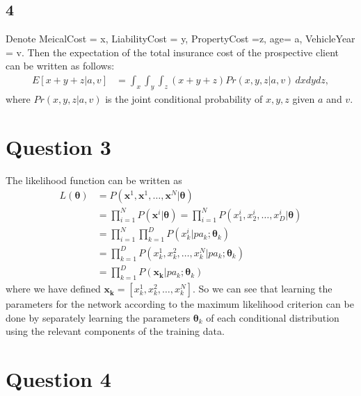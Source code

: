 \documentclass[paper=a4, fontsize=15pt]{article} %
\begin{document}
\subsection*{4}
Denote MeicalCost = x,  LiabilityCost = y,  PropertyCost =z, age= a, VehicleYear = v. 
Then the expectation of the total insurance cost of the prospective client can be written as follows:
\begin{align}
E[x+y+z|a,v]
& = \int_x \int_y \int_z (x+y+z) Pr(x,y,z|a,v)\, dxdydz,   \nonumber
\end{align}
where $Pr(x,y,z|a,v)$ is the joint conditional probability of $x,y,z$ given $a$ and $v$.




\section*{Question 3}
The likelihood function can be written as 
\begin{align}
L(\boldsymbol{\theta})
& = P(\textbf{x}^1,\textbf{x}^1,\ldots,\textbf{x}^N | \boldsymbol{\theta})\\
& = \prod_{i=1}^N P(\textbf{x}^i | \boldsymbol{\theta})
  =  \prod_{i=1}^N P({x}^i_1,{x}^i_2,\ldots,{x}^i_D | \boldsymbol{\theta})\\
& = \prod_{i=1}^N \prod_{k=1}^D P(x_k^i | pa_k; \boldsymbol{\theta}_k)\\
& = \prod_{k=1}^D P(x_k^1,x_k^2,\ldots,x_k^N | pa_k; \boldsymbol{\theta}_k)\\
& = \prod_{k=1}^D P(\boldsymbol{x_k} | pa_k; \boldsymbol{\theta}_k)
\end{align}
where we have defined $\boldsymbol{x_k}  = [x_k^1,x_k^2,\ldots,x_k^N]$. So we can see that learning the parameters for the network according to the maximum likelihood criterion can be done by separately learning the parameters $\boldsymbol{\theta}_k$ of each conditional distribution using the relevant components of the training data.



\section*{Question 4}
\end{document}
